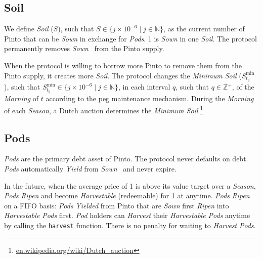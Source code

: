 \documentclass[tikz]{article}
\newcommand{\code}[1]{\texttt{#1}}
\newcommand{\term}[1]{\textsl{#1}}
\newcommand{\fref}[1]{\footnote{\href{http://#1}{#1}}}
\newcommand{\Pinto}{} %
\begin{document}
\vspace{-0.35cm}
\subsection{Soil}
\vspace{-0.35cm}

We define \term{Soil} ($S$), such that $S \in \{j \times 10^{-6} \mid j \in \mathbb{N} \}$, as the current number of Pinto that can be \term{Sown} in exchange for \term{Pods}. \Pinto1 is \term{Sown} in one \term{Soil}. The protocol permanently removes \term{Sown} \Pinto\ from the Pinto supply. 

\vspace{-0.2cm}

When the protocol is willing to borrow more Pinto to remove them from the Pinto supply, it creates more \term{Soil}. The protocol changes the \term{Minimum Soil} ($S_{t_{q}}^{\text{min}}$), such that $S_{t_{q}}^{\text{min}} \in \{j \times 10^{-6} \mid j \in \mathbb{N} \}$, in each interval $q$, such that $q \in \mathbb{Z}^{+}$, of the \term{Morning} of $t$ according to the peg maintenance mechanism. During the \term{Morning} of each \term{Season}, a Dutch auction determines the \term{Minimum Soil}.\fref{en.wikipedia.org/wiki/Dutch\_auction} 


\vspace{-0.35cm}
\subsection{Pods}
\vspace{-0.35cm}

\term{Pods} are the primary debt asset of Pinto. The protocol never defaults on debt. \term{Pods} automatically \term{Yield} from \term{Sown} \Pinto\ and never expire.

\vspace{-0.2cm}

In the future, when the average price of \Pinto1 is above its value target over a \term{Season}, \term{Pods} \term{Ripen} and become \term{Harvestable} (redeemable) for \Pinto1 at anytime. \term{Pods} \term{Ripen} on a FIFO basis: \term{Pods} \term{Yielded} from Pinto that are \term{Sown} first \term{Ripen} into \term{Harvestable Pods} first. \term{Pod} holders can \term{Harvest} their \term{Harvestable Pods} anytime by calling the \code{harvest} function. There is no penalty for waiting to \term{Harvest} \term{Pods}.
\end{document}
